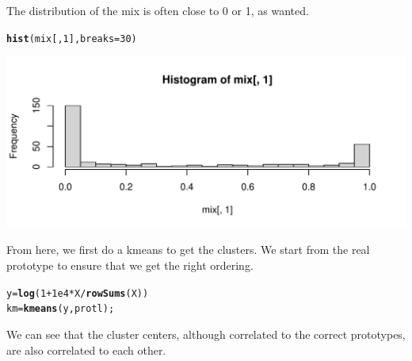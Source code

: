 \documentclass{article}\usepackage[]{graphicx}\usepackage[]{xcolor}
\makeatletter
\def\maxwidth{ %
  \ifdim\Gin@nat@width>\linewidth
    \linewidth
  \else
    \Gin@nat@width
  \fi
}
\newcommand{\hlnum}[1]{\textcolor[rgb]{0.686,0.059,0.569}{#1}}%
\newcommand{\hlopt}[1]{\textcolor[rgb]{0,0,0}{#1}}%
\newcommand{\hlstd}[1]{\textcolor[rgb]{0.345,0.345,0.345}{#1}}%
\newcommand{\hlkwb}[1]{\textcolor[rgb]{0.69,0.353,0.396}{#1}}%
\newcommand{\hlkwc}[1]{\textcolor[rgb]{0.333,0.667,0.333}{#1}}%
\newcommand{\hlkwd}[1]{\textcolor[rgb]{0.737,0.353,0.396}{\textbf{#1}}}%
\newenvironment{kframe}{%
 \def\at@end@of@kframe{}%
 \ifinner\ifhmode%
  \def\at@end@of@kframe{\end{minipage}}%
  \begin{minipage}{\columnwidth}%
 \fi\fi%
 \def\FrameCommand##1{\hskip\@totalleftmargin \hskip-\fboxsep
 \colorbox{shadecolor}{##1}\hskip-\fboxsep
     \hskip-\linewidth \hskip-\@totalleftmargin \hskip\columnwidth}%
 \MakeFramed {\advance\hsize-\width
   \@totalleftmargin\z@ \linewidth\hsize
   \@setminipage}}%
 {\par\unskip\endMakeFramed%
 \at@end@of@kframe}
\newenvironment{knitrout}{}{} %
\makeatother
\begin{document}
The distribution of the mix is often close to 0 or 1, as wanted.
\begin{knitrout}
\color{fgcolor}\begin{kframe}
\begin{alltt}
\hlkwd{hist}\hlstd{(mix[,}\hlnum{1}\hlstd{],} \hlkwc{breaks}\hlstd{=}\hlnum{30}\hlstd{)}
\end{alltt}
\end{kframe}
\includegraphics[width=\maxwidth]{figure/plotHistMix-1} 
\end{knitrout}

From here, we first do a kmeans to get the clusters.
We start from the real prototype to ensure that we get the right ordering.

\begin{knitrout}
\color{fgcolor}\begin{kframe}
\begin{alltt}
\hlstd{y} \hlkwb{=} \hlkwd{log}\hlstd{(}\hlnum{1}\hlopt{+}\hlnum{1e4}\hlopt{*}\hlstd{X}\hlopt{/}\hlkwd{rowSums}\hlstd{(X))}
\hlstd{km} \hlkwb{=} \hlkwd{kmeans}\hlstd{(y, protl);}
\end{alltt}
\end{kframe}
\end{knitrout}

We can see that the cluster centers, although correlated to the correct prototypes, are also correlated to each other.
\end{document}
